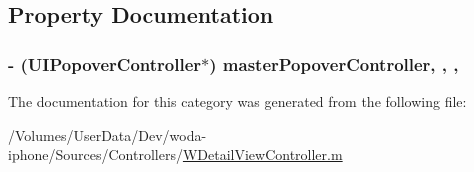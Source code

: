 \subsection{Property Documentation}
\hypertarget{category_w_detail_view_controller_07_08_a993433dc66358decf0756eee5e2ea31e}{
\subsubsection[{master\-Popover\-Controller}]{\setlength{\rightskip}{0pt plus 5cm}-\/ (U\-I\-Popover\-Controller$\ast$) master\-Popover\-Controller\hspace{0.3cm}{\ttfamily [read]}, {\ttfamily [write]}, {\ttfamily [nonatomic]}, {\ttfamily [strong]}}}\label{category_w_detail_view_controller_07_08_a993433dc66358decf0756eee5e2ea31e}


The documentation for this category was generated from the following file\-:\begin{DoxyCompactItemize}
\item 
/\-Volumes/\-User\-Data/\-Dev/woda-\/iphone/\-Sources/\-Controllers/\hyperlink{_w_detail_view_controller_8m}{W\-Detail\-View\-Controller.\-m}\end{DoxyCompactItemize}
